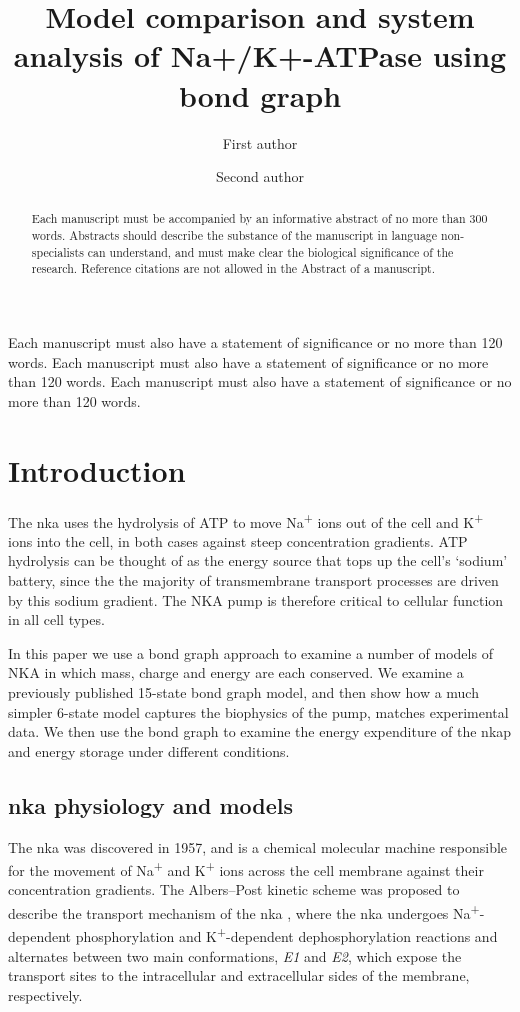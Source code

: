 \documentclass{biophys-new}
\title{Model comparison and system analysis of Na+/K+-ATPase using bond graph}
\author[1,*]{First author}
\author[2]{Second author}
\affil[1]{Institution A, Address A}
\affil[2]{Institution B, Address B}
\begin{document}
\begin{frontmatter}

\begin{abstract}
Each manuscript must be accompanied by an informative abstract of no more than 300 words. Abstracts should describe the substance of the manuscript in language non-specialists can understand, and must make clear the biological significance of the research. Reference citations are not allowed in the Abstract of a manuscript. 
\end{abstract}

\begin{sigstatement}
Each manuscript must also have a statement of significance or no more than 120 words. Each manuscript must also have a statement of significance or no more than 120 words. Each manuscript must also have a statement of significance or no more than 120 words.
\end{sigstatement}
\end{frontmatter}

\section*{Introduction}

The \gls{nka} uses the hydrolysis of ATP to move Na\textsuperscript{+} ions out of the cell and K\textsuperscript{+} ions into the cell,
in both cases against steep concentration gradients. ATP hydrolysis can be thought of as the energy source that tops up the cell's `sodium' battery,
since the the majority of transmembrane transport processes are driven by this sodium gradient.
The NKA pump is therefore critical to cellular function in all cell types.

In this paper we use a bond graph approach to examine a number of models of NKA in which mass, charge and energy are each conserved.
We examine a previously published 15-state bond graph model,
and then show how a much simpler 6-state model captures the biophysics of the pump, matches experimental data.
We then use the bond graph to examine the energy expenditure of the \Gls{nka}p and energy storage under different conditions.

\subsection*{\Gls{nka} physiology and models}

The \Gls{nka} was discovered in 1957\cite{skou_influence_1957},
and is a chemical molecular machine responsible for the movement of Na\textsuperscript{+} and K\textsuperscript{+} ions across the cell membrane against their concentration gradients.
The Albers–Post kinetic scheme \cite{albers_role_1963,post_activation_1972} was proposed to describe the transport mechanism of the \Gls{nka} \cite{apell_electrogenic_1989},
where the \Gls{nka} undergoes Na\textsuperscript{+}-dependent phosphorylation and K\textsuperscript{+}-dependent dephosphorylation reactions and alternates between two main conformations, 
\textit{E1} and \textit{E2}, which expose the transport sites to the intracellular and extracellular sides of the membrane, respectively.
\end{document}
